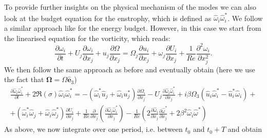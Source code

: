 \documentclass{jfm}
\begin{document}
To provide further insights on the physical mechanism of the modes we can also look at the budget equation for the enstrophy, which is defined as $\hat{\omega}_i \hat{\omega}_i^*$. We follow a similar approach like for the energy budget. However, in this case we start from the linearised equation for the vorticity, which reads:
%
\begin{equation}
  \frac{\partial \omega_i}{\partial t} + U_j \frac{\partial \omega_i}{\partial x_j} + u_j \frac{\partial \Omega}{\partial x_j} = \Omega_j \frac{\partial u_i}{\partial x_j} + \omega_j \frac{\partial U_i}{\partial x_j} + \frac{1}{Re} \frac{\partial^2 \omega_i}{\partial x_j^2}.
\end{equation}
%
We then follow the same approach as before and eventually obtain (here we use the fact that $\bm{\Omega} = \Omega \hat{\bm{e}}_3$)
%
\begin{equation}
  \begin{gathered}
  \frac{\partial \hat{\omega}_i \hat{\omega}^*_i}{\partial t} + 
  2 \Re(\sigma) \hat{\omega}_i \hat{\omega}_i^* = 
  - \left( \hat{\omega}_i^* \hat{u}_j + \hat{\omega}_i u_j^* \right) \frac{\partial \Omega_i}{\partial x_j} 
  - U_j \frac{\partial \hat{\omega}_i \hat{\omega}_i^* }{\partial x_j}  +
   i \beta \Omega_3 \left( \hat{u}_i \hat{\omega}_{i}^* - \hat{u}_i^* \hat{\omega}_i \right)  + \\
   + \left( \hat{\omega}_i^* \hat{\omega}_j + \hat{\omega}_i \hat{\omega}_j^* \right) \frac{\partial U_i}{\partial x_j} +
   \frac{1}{Re} \frac{\partial}{\partial x_j} \left( \frac{\partial \hat{\omega}_i \hat{\omega}_i^*}{\partial x_j} \right) -
   \frac{1}{Re} \left( 2 \frac{\partial \hat{\omega}_i}{\partial x_j} \frac{\partial \hat{\omega}^*}{\partial x_j} + 2 \beta^2 \hat{\omega}_i \hat{\omega}^* \right)
  \end{gathered}
\end{equation}
%
As above, we now integrate over one period, i.e. between $t_0$ and $t_0+T$ and obtain
%
\end{document}
